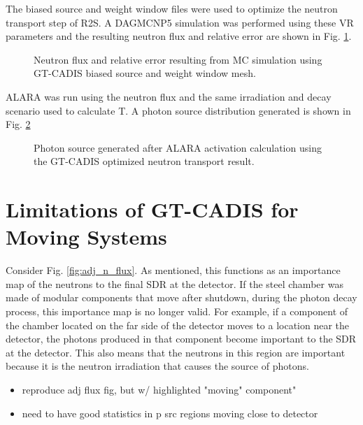 The biased source and weight window files were used to optimize the neutron
transport step of R2S.  A DAGMCNP5 simulation was performed using these VR
parameters and the resulting neutron flux and relative error are shown in Fig.
\ref{fig:gt_nflux}.

\begin{figure} \label{fig:gt_nflux}
	\caption [GT-CADIS neutron flux and relative error] 
	{Neutron flux and relative error resulting from MC simulation using
	 GT-CADIS biased source and weight window mesh.}
\end{figure}


ALARA was run using the neutron flux and the same irradiation and decay scenario used to calculate
T.  A photon source distribution generated is shown in Fig. \ref{fig:gt_psrc}

\begin{figure} \label{fig:gt_psrc}
	\caption [GT-CADIS photon source]
	{Photon source generated after ALARA activation calculation using the
	GT-CADIS optimized neutron transport result.}
\end{figure}




\section{Limitations of GT-CADIS for Moving Systems}

Consider Fig. \ref{fig:adj_n_flux}.  As mentioned, this functions as an
importance map of the neutrons to the final SDR at the detector.  If the steel
chamber was made of modular components that move after shutdown, during the
photon decay process, this importance map is no longer valid.  For example, if
a component of the chamber located on the far side of the detector moves to a
location near the detector, the photons produced in that component become
important to the SDR at the detector.  This also means that the neutrons in
this region are important because it is the neutron irradiation that causes the
source of photons.


\begin{itemize}
	\item reproduce adj flux fig, but w/ highlighted "moving" component"
	\item need to have good statistics in p src regions moving
			close to detector
\end{itemize}

